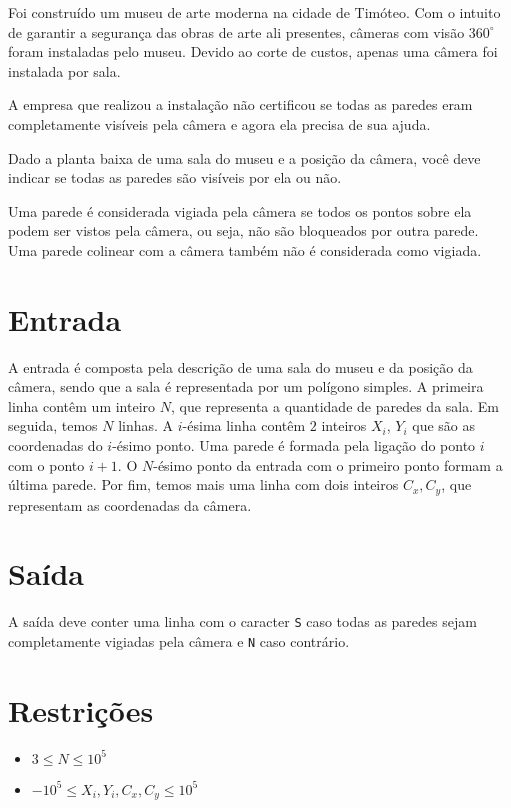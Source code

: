 Foi construído um museu de arte moderna na cidade de Timóteo. Com o intuito de garantir a segurança das obras
de arte ali presentes, câmeras com visão $360 ^{\circ}$ foram instaladas pelo museu.
Devido ao corte de custos, apenas uma câmera foi instalada por sala.

A empresa que realizou a instalação não certificou se todas as paredes eram completamente visíveis pela câmera e agora ela precisa de sua ajuda.

Dado a planta baixa de uma sala do museu e a posição da câmera, você deve indicar se todas as paredes são visíveis por ela ou não.

Uma parede é considerada vigiada pela câmera se todos os pontos sobre ela podem ser vistos pela câmera, ou seja, não são bloqueados por outra parede.
Uma parede colinear com a câmera também não é considerada como vigiada.


\section*{Entrada}

A entrada é composta pela descrição de uma sala do museu e da posição da câmera, sendo que a sala é
representada por um polígono simples.
A primeira linha contêm um inteiro $N$, que representa a quantidade de paredes da sala.
Em seguida, temos $N$ linhas. A $i$-ésima linha contêm $2$ inteiros $X_i$, $Y_i$ que são as coordenadas do $i$-ésimo ponto.
Uma parede é formada pela ligação do ponto $i$ com o ponto $i+1$. O $N$-ésimo ponto da entrada com o primeiro ponto formam a última parede.
Por fim, temos mais uma linha com dois inteiros $C_x, C_y$, que representam as coordenadas da câmera.

\section*{Saída}

A saída deve conter uma linha com o caracter \texttt{S} caso todas as paredes sejam completamente vigiadas pela câmera e \texttt{N} caso contrário.

\section*{Restrições}

\begin{itemize}
    \item $3 \leq N \leq 10^5 $
    \item $-10^5 \leq X_i, Y_i, C_x, C_y \leq 10^5 $
\end{itemize}

